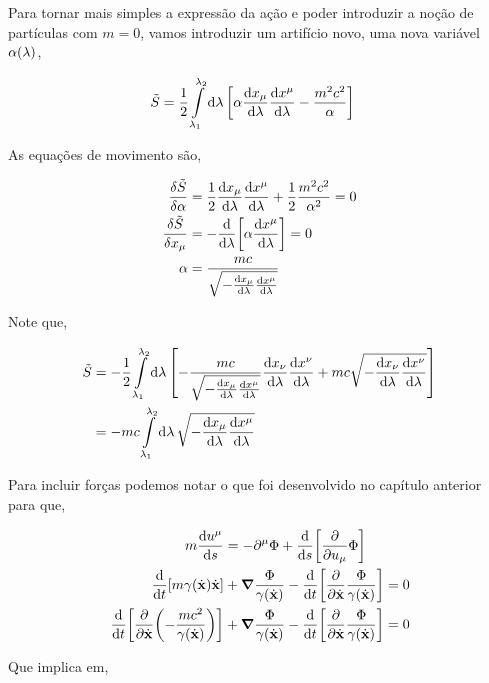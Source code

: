 \documentclass[twoside]{amsart}
\numberwithin{equation}{section}
\begin{document}
Para tornar mais simples a expressão da ação e poder introduzir a noção de partículas com $m=0$, vamos introduzir um artifício novo, uma nova variável $\alpha\qty(\lambda)$,

\begin{align}
    \tilde S&=\frac12\int\limits_{\lambda_1}^{\lambda_2}\dd{\lambda}\qty[\alpha\dv{x_\mu}{\lambda}\dv{x^\mu}{\lambda}-\frac{m^2c^2}{\alpha}]
\end{align}

As equações de movimento são,

\begin{align}
    \fdv{\tilde S}{\alpha}&=\frac12\dv{x_\mu}{\lambda}\dv{x^\mu}{\lambda}+\frac12 \frac{m^2c^2}{\alpha^2}=0\\
    \fdv{\tilde S}{x_\mu}&=-\dv{}{\lambda}\qty[\alpha\dv{x^\mu}{\lambda}]=0\\
    \alpha&=\frac{mc}{\sqrt{-\dv{x_\mu}{\lambda}\dv{x^\mu}{\lambda}}}
\end{align}

Note que,

\begin{align}
    \tilde S&=-\frac12\int\limits_{\lambda_1}^{\lambda_2}\dd{\lambda}\qty[-\frac{mc}{\sqrt{-\dv{x_\mu}{\lambda}\dv{x^\mu}{\lambda}}}\dv{x_\nu}{\lambda}\dv{x^\nu}{\lambda}+mc\sqrt{-\dv{x_\nu}{\lambda}\dv{x^\nu}{\lambda}}]\\
    &=-mc\int\limits_{\lambda_1}^{\lambda_2}\dd{\lambda}\sqrt{-\dv{x_\mu}{\lambda}\dv{x^\mu}{\lambda}}
\end{align}

Para incluir forças podemos notar o que foi desenvolvido no capítulo anterior para que,

\begin{align}
    m\dv{u^\mu}{s}&=-\partial^\mu\Phi+\dv{}{s}\qty[\pdv{}{u_\mu}\Phi]\\
    \dv{}{t}\qty[m\gamma\qty(\dot{\vb x})\dot{\vb x}]&+\grad\frac{\Phi}{\gamma\qty(\dot{\vb x})}-\dv{}{t}\qty[\pdv{}{\dot{\vb x}}\frac{\Phi}{\gamma\qty(\dot{\vb x})}]=0\\
    \dv{}{t}\qty[\pdv{}{\dot{\vb x}}\qty(-\frac{mc^2}{\gamma\qty(\dot{\vb x})})]&+\grad\frac{\Phi}{\gamma\qty(\dot{\vb x})}-\dv{}{t}\qty[\pdv{}{\dot{\vb x}}\frac{\Phi}{\gamma\qty(\dot{\vb x})}]=0
\end{align}

Que implica em,
\end{document}
